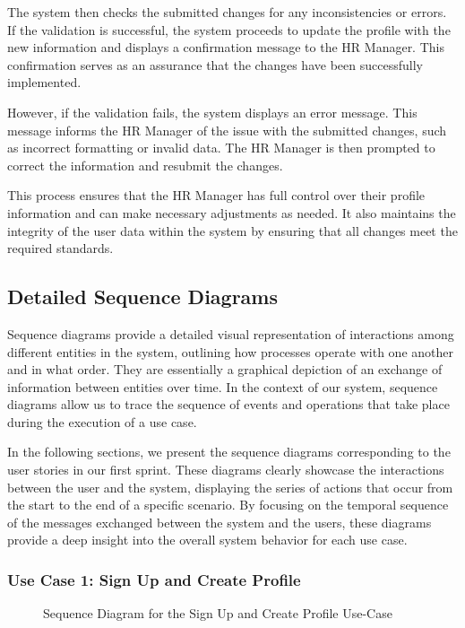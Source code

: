 The system then checks the submitted changes for any inconsistencies or errors. If the validation is successful, the system proceeds to update the profile with the new information and displays a confirmation message to the HR Manager. This confirmation serves as an assurance that the changes have been successfully implemented.

However, if the validation fails, the system displays an error message. This message informs the HR Manager of the issue with the submitted changes, such as incorrect formatting or invalid data. The HR Manager is then prompted to correct the information and resubmit the changes.

This process ensures that the HR Manager has full control over their profile information and can make necessary adjustments as needed. It also maintains the integrity of the user data within the system by ensuring that all changes meet the required standards.

\subsection{Detailed Sequence Diagrams}
Sequence diagrams provide a detailed visual representation of interactions among different entities in the system, outlining how processes operate with one another and in what order. They are essentially a graphical depiction of an exchange of information between entities over time. In the context of our system, sequence diagrams allow us to trace the sequence of events and operations that take place during the execution of a use case.

In the following sections, we present the sequence diagrams corresponding to the user stories in our first sprint. These diagrams clearly showcase the interactions between the user and the system, displaying the series of actions that occur from the start to the end of a specific scenario. By focusing on the temporal sequence of the messages exchanged between the system and the users, these diagrams provide a deep insight into the overall system behavior for each use case.

\subsubsection{Use Case 1: Sign Up and Create Profile} 


\begin{figure}[H]
    \centering
    \caption{ Sequence Diagram for the Sign Up and Create Profile Use-Case }
    \label{fig:UseCase1_Sequence_Diagram}
\end{figure}


